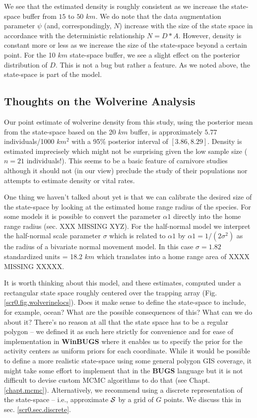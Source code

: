 We see that the estimated density is roughly consistent as we increase
the state-space buffer from $15$ to $50$ $km$. We do note that the data
augmentation parameter $\psi$ (and, correspondingly, $N$) increase with
the size of the state space in accordance with the deterministic
relationship $N= D*A$. However, density is constant more or less as we
increase the size of the state-space beyond a certain point.  For the
10 $km$ state-space buffer, we see a slight effect on the posterior
distribution of $D$. This is not a bug but rather a feature. As we noted
above, the state-space is part of the model.


\subsection{Thoughts on the Wolverine Analysis}

Our point estimate of wolverine density from this study, using the
posterior mean from the state-space based on the 20
$km$ buffer, is 
approximately $5.77$ individuals/1000 $km^2$ with  a 95\% posterior
interval of $[3.86, 8.29]$. Density is estimated imprecisely
which might not be surprising given the low sample size ($n=21$
individuals!). This seems to be a basic feature of carnivore studies
although it should not (in our view) preclude the study of their
populations nor attempts to estimate density or vital rates.

One thing we haven't talked about yet is that we can calibrate the
desired size of the state-space by looking at the estimated home range
radius of the species. For some models it is possible to convert the
parameter $\alpha1$ directly into the home range radius (sec. 
XXX MISSING XYZ). For the half-normal model we interpret the half-normal scale
parameter $\sigma$ which is related to $\alpha1$ by $\alpha1 =
1/(2\sigma^2)$ as the radius of a bivariate normal movement model. 
In this case $\sigma = 1.82$ standardized units = 18.2 $km$ which 
translates into a home range area of XXXX MISSING XXXXX. 

It is worth thinking about this model, and these estimates, computed
under a rectangular state space roughly centered over the trapping
array (Fig. \ref{scr0.fig.wolverinelocs}).
Does it make sense to define the state-space to
include, for example, ocean? What are the possible consequences of
this? What can we do about it?  There's no reason at all that the
state space has to be a regular polygon -- we defined it as such here
strictly for convenience and for ease of implementation in {\bf WinBUGS}
where it enables us to specify the prior for the activity centers as
uniform priors for each coordinate.  While it would be possible to
define a more realistic state-space using some general polygon GIS coverage, it
might take some effort to implement that in the {\bf BUGS} language
but it is not difficult to devise custom MCMC algorithms to do that
(see Chapt. \ref{chapt.mcmc}).
Alternatively, we recommend
using a discrete representation of the state-space -- i.e., approximate
${\cal S}$ by a grid of $G$ points. We discuss this in sec. 
\ref{scr0.sec.discrete}.


